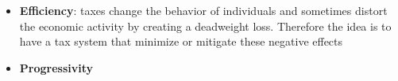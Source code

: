 \documentclass[
  ignorenonframetext,
  english,
]{beamer}
\providecommand{\tightlist}{%
  \setlength{\itemsep}{0pt}\setlength{\parskip}{0pt}}\usepackage{longtable,booktabs,array}
\begin{document}
\begin{frame}{}
\label{section-16}
\begin{itemize}
\tightlist
\item
  \textbf{Efficiency}: taxes change the behavior of individuals and
  sometimes distort the economic activity by creating a deadweight loss.
  Therefore the idea is to have a tax system that minimize or mitigate
  these negative effects
\end{itemize}
\end{frame}

\begin{frame}{}
\label{section-17}
\begin{itemize}
\tightlist
\item
  \textbf{Progressivity}
\end{itemize}

\footnotesize

\begin{figure}

\begin{minipage}{0.45\linewidth}



\end{minipage}%
%
\begin{minipage}{0.10\linewidth}
~\end{minipage}%
%
\begin{minipage}{0.45\linewidth}

\end{minipage}
\end{figure}
\end{frame}
\end{document}

